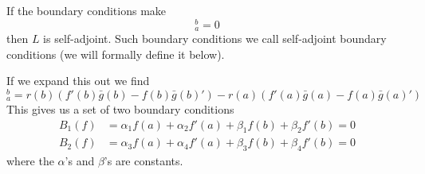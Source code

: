 \begin{rmk}
If the boundary conditions make
\begin{equation}
[r(x)(f'(x)\overline{g(x)}-f(x)\overline{g'(x)})]^{b}_{a}=0
\end{equation}
then $L$ is self-adjoint. Such boundary conditions we call
self-adjoint boundary conditions (we will formally define it
below).
\end{rmk}

If we expand this out we find
\begin{equation}
[r(f'\bar{g}-f\bar{g}')]^{b}_{a} = r(b)(f'(b)\bar{g}(b)-f(b)\bar{g}(b)') - r(a)(f'(a)\bar{g}(a)-f(a)\bar{g}(a)')
\end{equation}
This gives us a set of two boundary conditions
\begin{align*}
B_{1}(f)&=\alpha_1f(a)+\alpha_2f'(a)+\beta_1f(b)+\beta_2f'(b)=0\\
B_{2}(f)&=\alpha_3f(a)+\alpha_4f'(a)+\beta_3f(b)+\beta_4f'(b)=0
\end{align*}
where the $\alpha$'s and $\beta$'s are constants.

